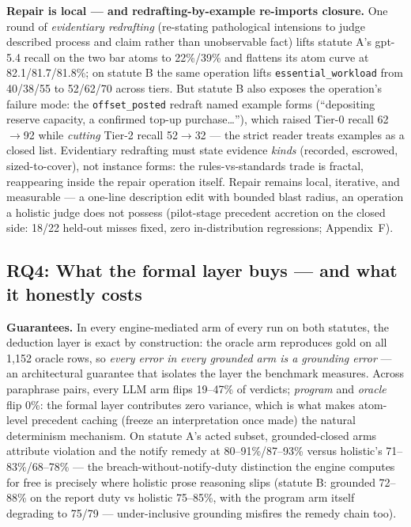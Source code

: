 \textbf{Repair is local --- and redrafting-by-example re-imports closure.}
One round of \emph{evidentiary redrafting} (re-stating pathological
intensions to judge described process and claim rather than unobservable
fact) lifts statute A's gpt-5.4 recall on the two bar atoms to 22\%/39\% and
flattens its atom curve at 82.1/81.7/81.8\%; on statute B the same operation
lifts \texttt{essential\_workload} from 40/38/55 to 52/62/70 across tiers.
But statute B also exposes the operation's failure mode: the
\texttt{offset\_posted} redraft named example forms (``depositing reserve
capacity, a confirmed top-up purchase\dots''), which raised Tier-0 recall
62$\to$92 while \emph{cutting} Tier-2 recall 52$\to$32 --- the strict reader
treats examples as a closed list. Evidentiary redrafting must state evidence
\emph{kinds} (recorded, escrowed, sized-to-cover), not instance forms: the
rules-vs-standards trade is fractal, reappearing inside the repair operation
itself. Repair remains local, iterative, and measurable --- a one-line
description edit with bounded blast radius, an operation a holistic judge
does not possess (pilot-stage precedent accretion on the closed side: 18/22
held-out misses fixed, zero in-distribution regressions; Appendix~F).

\subsection{RQ4: What the formal layer buys --- and what it honestly costs}

\textbf{Guarantees.} In every engine-mediated arm of every run on both
statutes, the deduction layer is exact by construction: the oracle arm
reproduces gold on all 1{,}152 oracle rows, so \emph{every error in every
grounded arm is a grounding error} --- an architectural guarantee that
isolates the layer the benchmark measures. Across paraphrase pairs, every
LLM arm flips 19--47\% of verdicts; \emph{program} and \emph{oracle} flip
0\%: the formal layer contributes zero variance, which is what makes
atom-level precedent caching (freeze an interpretation once made) the
natural determinism mechanism. On statute A's acted subset, grounded-closed
arms attribute violation and the notify remedy at 80--91\%/87--93\% versus
holistic's 71--83\%/68--78\% --- the breach-without-notify-duty distinction
the engine computes for free is precisely where holistic prose reasoning
slips (statute B: grounded 72--88\% on the report duty vs holistic
75--85\%, with the program arm itself degrading to 75/79 --- under-inclusive
grounding misfires the remedy chain too).

